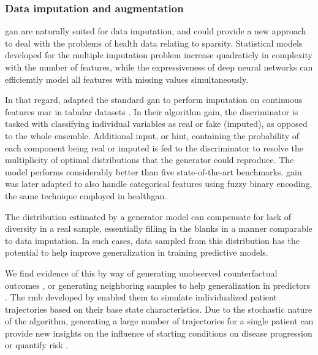     \subsubsection{Data imputation and augmentation}
    
        \gls{gan} are naturally suited for data imputation, and could provide a new approach to deal with the problems of health data relating to sparsity. Statistical models developed for the multiple imputation problem increase quadraticly in complexity with the number of features, while the expressiveness of deep neural networks can efficiemtly model all features with missing values simultaneously.\par
    
        In that regard, \citeauthor{yoon2018imputation} adapted the standard \gls{gan} to perform imputation on continuous features \gls{mar} in tabular datasets \cite{yoon2018imputation}. In their algorithm \gls{gain}, the discriminator is tasked with classifying individual variables as real or fake (imputed), as opposed to the whole ensemble. Additional input, or hint, containing the probability of each component being real or imputed is fed to the discriminator to resolve the multiplicity of optimal distributions that the generator could reproduce. The model performs considerably better than five state-of-the-art benchmarks. \gls{gain} was later adapted to also handle categorical features using fuzzy binary encoding, the same technique employed in \gls{healthgan}.\par
    
        The distribution estimated by a generator model can compensate for lack of diversity in a real sample, essentially filling in the blanks in a manner comparable to data imputation. In such cases, data sampled from this distribution has the potential to help improve generalization in training predictive models.\par 
        
        We find evidence of this by way of generating unobserved counterfactual outcomes \cite{yoon2018imputation}, or generating neighboring samples to help generalization in predictors \cite{Che_2017}. The \gls{rmb} developed by \citeauthor{Fisher2019} enabled them to simulate individualized patient trajectories based on their base state characteristics. Due to the stochastic nature of the algorithm, generating a large number of trajectories for a single patient can provide new insights on the influence of starting conditions on disease progression or quantify risk \cite{Fisher2019}.
        
